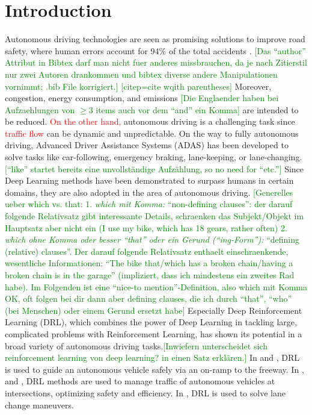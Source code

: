 \documentclass[review]{elsarticle}
\providecommand{\red}[1]{\textcolor{red}{#1}}
\providecommand{\green}[1]{\textcolor{green}{#1}}
\providecommand{\martin}[1]{\red{#1}} %
\providecommand{\martinc}[1]{\green{[#1]}} %
\providecommand{\3}{{\ss}}
\begin{document}
\section{Introduction}
Autonomous driving technologies are seen as promising solutions to
improve road safety, where human errors account for 94\% of the total
accidents \citep{vehicleCrashSurvey2015}.  
\martinc{Das ``author'' Attribut in Bibtex darf man nicht
  fuer anderes missbrauchen, da je nach Zitierstil nur zwei Autoren
  drankommen und bibtex diverse andere Manipulationen vornimmt; .bib
  File korrigiert.}
  \martinc{citep=cite wqith parentheses}
Moreover, congestion, energy
consumption, and emissions \martinc{Die Englaender haben bei
  Aufzaehlungen von $\ge 3$ items auch vor dem ``and'' ein Komma} are intended to be reduced. 
\martin{On the other hand,} autonomous driving is a challenging task
since \martin{traffic flow} can be dynamic and unpredictable.
On the way to fully autonomous driving, Advanced Driver Assistance Systems
(ADAS) has been developed to solve tasks like car-following, emergency
braking, lane-keeping, or lane-changing. \martinc{``like'' startet
  bereits eine unvollst\"andige Aufz\"ahlung, so no need for ``etc.''}
Since Deep Learning methods have been demonstrated to surpass humans
in certain domains, they are also adopted in the area of autonomous
driving.
\martinc{Generelles ueber which vs. that: 
1. \emph{which mit Komma:}
  ``non-defining clauses'': der darauf folgende Relativsatz gibt interessante Details,
  schraenken das Subjekt/Objekt im Hauptsatz aber nicht ein (I use my bike, which has 18
  gears, rather often)
2. \emph{which ohne Komma oder besser ``that'' oder ein Gerund (``ing-Form''):} ``defining (relative)
clauses''. Der darauf folgende Relativsatz enthaelt einschraenkende,
wesentliche Informationen: ``The bike that/which has a
broken chain/having a broken chain is in the garage'' (impliziert,
dass ich mindestens ein zweites Rad habe). Im Folgenden ist eine ``nice-to
mention''-Definition, also which mit Komma OK, oft folgen bei dir dann
aber defining clauses, die ich durch ``that'', ``who'' (bei Menschen)
oder einem Gerund ersetzt habe}
Especially Deep Reinforcement Learning (DRL), which combines the power
of Deep Learning in tackling large, complicated problems with
Reinforcement Learning, has shown its potential in a broad variety of
autonomous driving tasks.\martinc{Inwiefern unterscheidet sich
  reinforcement learning von deep learning? in einen Satz erkl\"aren.}  
In \cite{OnRampMerge2018} and \cite{OnRampMerge2020}, DRL is used to
guide an autonomous vehicle safely via an on-ramp to the freeway. In \cite{intersection1}, \cite{intersection3} and \cite{intersection2}, DRL methods are used to manage traffic of autonomous vehicles at intersections, optimizing safety and efficiency.
In \cite{LangeChange1}, DRL is used to solve lane change maneuvers.
\end{document}
